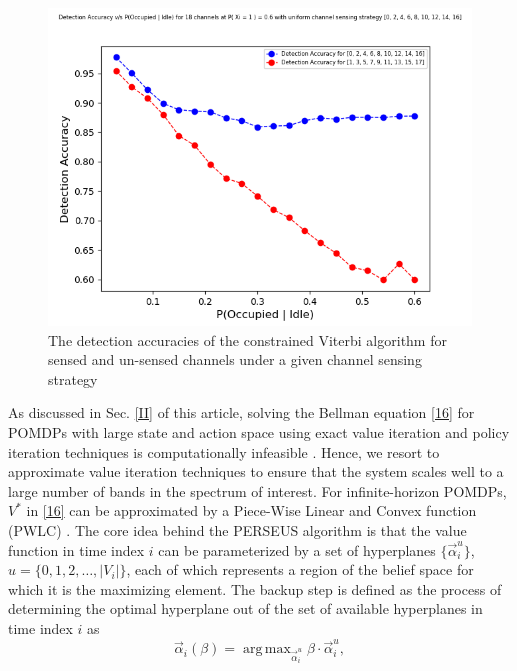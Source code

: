 \documentclass[10pt,twocolumn]{IEEEtran}
\newcommand{\nm}[1]{}
\DeclareMathOperator*{\argmax}{arg\,max}
\begin{document}
\begin{figure}
    \centering
    \includegraphics[scale=0.5]{Uniform_Channel_Sensing_1.png}
    \caption{The detection accuracies of the constrained Viterbi algorithm for sensed and un-sensed channels under a given channel sensing strategy}
    \label{fig:4}
\end{figure}
As discussed in Sec. \ref{II} of this article, solving the Bellman equation \eqref{16} for POMDPs with large state and action space using exact value iteration and policy iteration techniques \cite{Kaelbling:1998:PAP:1643275.1643301} is computationally infeasible \cite{DBLP:journals/corr/abs-1109-2145, Pineau:2003:PVI:1630659.1630806}. Hence, we resort to approximate value iteration techniques to ensure that the system scales well to a large number of bands in the spectrum of interest. For infinite-horizon POMDPs, $V^*$ in \eqref{16} can be approximated by a Piece-Wise Linear and Convex function (PWLC) \cite{Kaelbling:1998:PAP:1643275.1643301}. The core idea behind the PERSEUS algorithm is that the value function in time index $i$ can be parameterized by a set of hyperplanes $\{\vec{\alpha}_i^{u}\}$, $u = \{0,1,2,\dots,|V_i|\}$, each of which represents a region of the belief space for which it is the maximizing element. The backup step is defined as the process of determining the optimal hyperplane out of the set of available hyperplanes in time index $i$ as
\begin{equation}\label{39}
    \vec{\alpha}_{i}(\beta) = \argmax_{\vec{\alpha}_{i}^u} \beta \cdot \vec{\alpha}_{i}^u,
\end{equation}
\nm{argmax from which set?}
\end{document}
